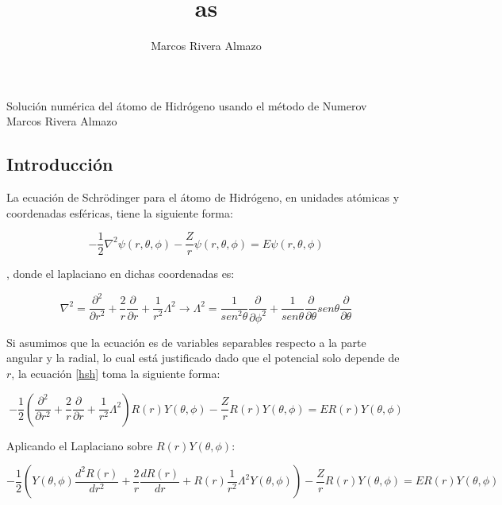 \documentclass[12pt,a4paper]{report}
\author{Marcos Rivera Almazo}
\title{ as}
\begin{document}
\begin{center}
{\huge Solución numérica del átomo de Hidrógeno usando el método de Numerov}\\
\vspace{0.5cm}
{\Large Marcos Rivera Almazo}
\end{center}

\subsection*{Introducción}

La ecuación de Schrödinger para el átomo de Hidrógeno, en unidades atómicas y coordenadas esféricas, tiene la siguiente forma:

\begin{equation}\label{hsh}
-\frac{1}{2}\nabla^2 \psi (r,\theta,\phi) - \frac{Z}{r} \psi (r,\theta,\phi)=E \psi (r,\theta,\phi)
\end{equation}

, donde el laplaciano en dichas coordenadas es:

\begin{equation}\label{lapl}
\nabla^2= \frac{\partial^2}{\partial r^2} + \frac{2}{r} \frac{\partial}{\partial r} +\frac{1}{r^2} \Lambda^2 \rightarrow \Lambda^2=\frac{1}{sen^2\theta} \frac{\partial}{\partial \phi^2} + \frac{1}{sen \theta} \frac{\partial}{\partial \theta} sen \theta \frac{\partial}{\partial \theta}
\end{equation}

Si asumimos que la ecuación es de variables separables respecto a la parte angular y la radial, lo cual está justificado dado que el potencial solo depende de $r$, la ecuación \ref{hsh} toma la siguiente forma:

\begin{equation}\label{sepa}
-\frac{1}{2} \left(\frac{\partial^2}{\partial r^2} + \frac{2}{r} \frac{\partial}{\partial r} +\frac{1}{r^2} \Lambda^2\right) R(r)Y(\theta,\phi) - \frac{Z}{r} R(r)Y(\theta,\phi)=E R(r)Y(\theta,\phi)
\end{equation}

Aplicando el Laplaciano sobre $R(r)Y(\theta,\phi)$:

\begin{equation}\label{hlap}
-\frac{1}{2} \left( Y(\theta,\phi) \frac{d^2 R(r)}{d r^2} + \frac{2}{r} \frac{d R(r)}{dr} + R(r) \frac{1}{r^2} \Lambda^2 Y(\theta,\phi)\right) - \frac{Z}{r} R(r)Y(\theta,\phi)=E R(r)Y(\theta,\phi)
\end{equation}
\end{document}
